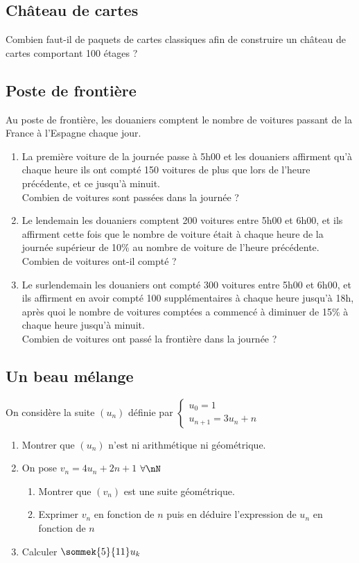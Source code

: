 \documentclass[oneside,12pt]{book}          %
\begin{document}
\subsection{Château de cartes}
Combien faut-il de paquets de cartes classiques afin de construire un château de cartes comportant 100 étages ?



\subsection{Poste de frontière}
Au poste de frontière, les douaniers comptent le nombre de voitures passant de la France à l'Espagne chaque jour.
\begin{enumerate}
	\item La première voiture de la journée passe à 5h00 et les douaniers affirment qu'à chaque heure ils ont compté 150 voitures de plus que lors de l'heure précédente, et ce jusqu'à minuit.\\
	Combien de voitures sont passées dans la journée ?
	\item Le lendemain les douaniers comptent 200 voitures entre 5h00 et 6h00, et ils affirment cette fois que le nombre de voiture était à chaque heure de la journée supérieur de 10\% au nombre de voiture de l'heure précédente.\\
	Combien de voitures ont-il compté ?
	\item Le surlendemain les douaniers ont compté 300 voitures entre 5h00 et 6h00, et ils affirment en avoir compté 100 supplémentaires à chaque heure jusqu'à 18h, après quoi le nombre de voitures comptées a commencé à diminuer de 15\% à chaque heure jusqu'à minuit.\\
	Combien de voitures ont passé la frontière dans la journée ?
\end{enumerate}



\subsection{Un beau mélange}
On considère la suite $(u_n)$ définie par $\begin{cases}u_0=1\\u_{n+1}=3u_n+n\end{cases}$
\begin{enumerate}
	\item Montrer que $(u_n)$ n'est ni arithmétique ni géométrique.
	\item On pose $v_n=4u_n+2n+1$ \quad $\forall\nN$
	\begin{enumerate}
		\item Montrer que $(v_n)$ est une suite géométrique.
		\item Exprimer $v_n$ en fonction de $n$ puis en déduire l'expression de $u_n$ en fonction de $n$
	\end{enumerate}
	\item Calculer $\sommek{5}{11}u_k$
\end{enumerate}
\end{document}
